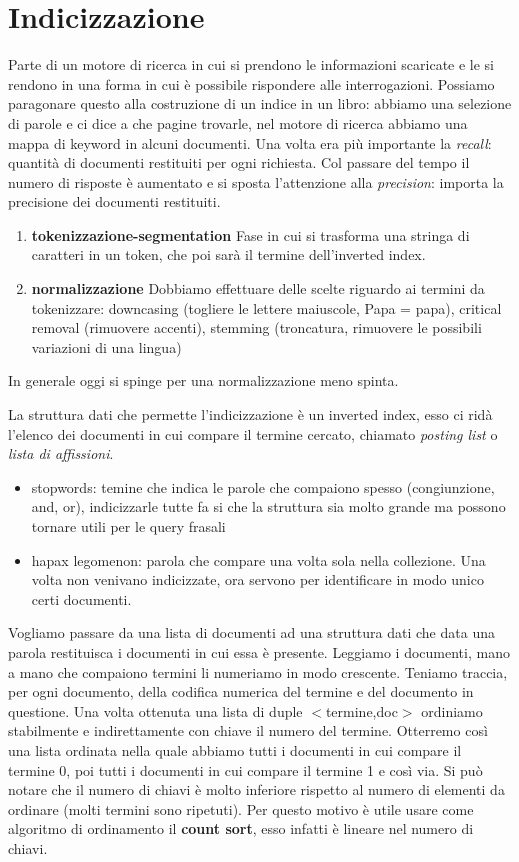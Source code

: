 \documentclass[12pt,italian]{report}
\begin{document}
\chapter{Indicizzazione}
\label{cap:indicizzazione}
Parte di un motore di ricerca in cui si prendono le informazioni scaricate e le si rendono in una forma in cui è possibile rispondere alle interrogazioni. 
Possiamo paragonare questo alla costruzione di un indice in un libro: abbiamo una selezione di parole e ci dice a che pagine trovarle, nel motore di ricerca abbiamo una mappa di keyword in alcuni documenti. 
Una volta era più importante la \textit{recall}: quantità di documenti restituiti per ogni richiesta. Col passare del tempo il numero di risposte è aumentato e si sposta l'attenzione alla \textit{precision}: importa la precisione dei documenti restituiti.


\begin{enumerate}
    \item \textbf{tokenizzazione-segmentation}
    Fase in cui si trasforma una stringa di caratteri in un token, che poi sarà il termine dell'inverted index.
    \item \textbf{normalizzazione}
    Dobbiamo effettuare delle scelte riguardo ai termini da tokenizzare: downcasing (togliere le lettere maiuscole, Papa = papa), critical removal (rimuovere accenti), stemming (troncatura, rimuovere le possibili variazioni di una lingua)
\end{enumerate}
In generale oggi si spinge per una normalizzazione meno spinta.

La struttura dati che permette l'indicizzazione è un inverted index, esso ci ridà l'elenco dei documenti in cui compare il termine cercato, chiamato \textit{posting list} o \textit{lista di affissioni}.

\begin{itemize}
    \item stopwords: temine che indica le parole che compaiono spesso (congiunzione, and, or), indicizzarle tutte fa si che la struttura sia molto grande ma possono tornare utili per le query frasali
    \item hapax legomenon: parola che compare una volta sola nella collezione. Una volta non venivano indicizzate, ora servono per identificare in modo unico certi documenti.
\end{itemize}

Vogliamo passare da una lista di documenti ad una struttura dati che data una parola restituisca i documenti in cui essa è presente. Leggiamo i documenti, mano a mano che compaiono termini li numeriamo in modo crescente. Teniamo traccia, per ogni documento, della codifica numerica del termine e del documento in questione.
Una volta ottenuta una lista di duple $<$termine,doc$>$ ordiniamo stabilmente e indirettamente con chiave il numero del termine. Otterremo così una lista ordinata nella quale abbiamo tutti i documenti in cui compare il termine 0, poi tutti i documenti in cui compare il termine 1 e così via.
Si può notare che il numero di chiavi è molto inferiore rispetto al numero di elementi da ordinare (molti termini sono ripetuti). Per questo motivo è utile usare come algoritmo di ordinamento il \textbf{count sort}, esso infatti è lineare nel numero di chiavi.\medskip
\end{document}
